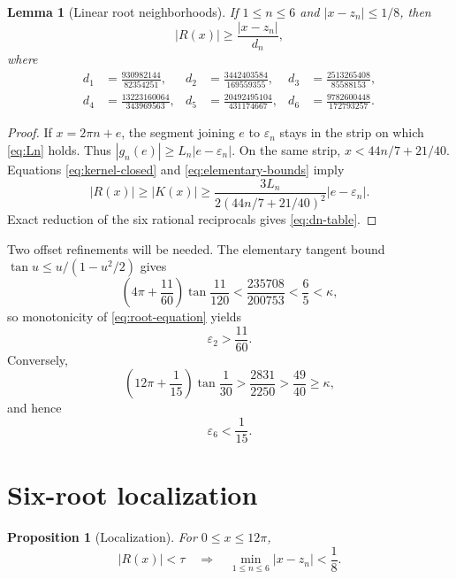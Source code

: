 \documentclass[11pt,reqno]{amsart}
\newtheorem{proposition}[theorem]{Proposition}
\newtheorem{lemma}[theorem]{Lemma}
\theoremstyle{definition}
\theoremstyle{remark}
\newcommand{\eps}{\varepsilon}
\begin{document}
\begin{lemma}[Linear root neighborhoods]\label{lem:slopes}
If $1\le n\le6$ and $|x-z_n|\le1/8$, then
\begin{equation}\label{eq:local-slope}
 |R(x)|\ge \frac{|x-z_n|}{d_n},
\end{equation}
where
\begin{equation}\label{eq:dn-table}
\begin{aligned}
d_1&=\frac{930982144}{82354251},&
d_2&=\frac{3442403584}{169559355},&
d_3&=\frac{2513265408}{85588153},\\
d_4&=\frac{13223160064}{343969563},&
d_5&=\frac{20492495104}{431174667},&
d_6&=\frac{9782600448}{172793257}.
\end{aligned}
\end{equation}
\end{lemma}

\begin{proof}
If $x=2\pi n+e$, the segment joining $e$ to $\eps_n$ stays in the strip on
which \eqref{eq:Ln} holds.  Thus
$|g_n(e)|\ge L_n|e-\eps_n|$.  On the same strip,
$x<44n/7+21/40$.  Equations \eqref{eq:kernel-closed} and
\eqref{eq:elementary-bounds} imply
\[
 |R(x)|\ge|K(x)|\ge
 \frac{3L_n}{2(44n/7+21/40)^2}|e-\eps_n|.
\]
Exact reduction of the six rational reciprocals gives
\eqref{eq:dn-table}.
\end{proof}

Two offset refinements will be needed.  The elementary tangent bound
$\tan u\le u/(1-u^2/2)$ gives
\[
 \left(4\pi+\frac{11}{60}\right)\tan\frac{11}{120}
 <\frac{235708}{200753}<\frac65<\kappa,
\]
so monotonicity of \eqref{eq:root-equation} yields
\begin{equation}\label{eq:eps2}
 \eps_2>\frac{11}{60}.
\end{equation}
Conversely,
\[
 \left(12\pi+\frac1{15}\right)\tan\frac1{30}
 >\frac{2831}{2250}>\frac{49}{40}\ge\kappa,
\]
and hence
\begin{equation}\label{eq:eps6}
 \eps_6<\frac1{15}.
\end{equation}

\section{Six-root localization}

\begin{proposition}[Localization]\label{prop:localization}
For $0\le x\le12\pi$,
\begin{equation}\label{eq:localization}
 |R(x)|<\tau
 \quad\Longrightarrow\quad
 \min_{1\le n\le6}|x-z_n|<\frac18.
\end{equation}
\end{proposition}
\end{document}
